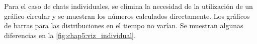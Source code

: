 \vspace{8mm}

Para el caso de chats individuales, se elimina la necesidad de la utilización de un gráfico circular y se muestran los números calculados directamente. Los gráficos de barras para las distribuciones en el tiempo no varían. Se muestran algunas diferencias en la \autoref{fig:chap5:viz_individual}.

\begin{figure}[h]
	\centering
	\qquad
	\centering
	

\end{figure}
